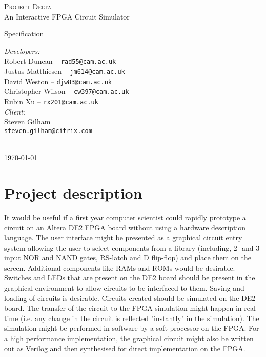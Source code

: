 \documentclass[12pt, a4paper, oneside,titlepage]{article}
\begin{document}
 \begin{titlepage}
 \begin{center}
 \textsc{\huge{Project Delta}} \\
 {\Large{An Interactive FPGA Circuit Simulator}}
\end{center}
\vspace{10em}
 \begin{center}
{\huge{Specification}}
\end{center}
\vfill
\setlength{\columnsep}{10em}
\begin{multicols}{2}{
\emph{Developers:}\\
Robert Duncan -- \texttt{rad55@cam.ac.uk} \\
Justus Matthiesen -- \texttt{jm614@cam.ac.uk}\\
David Weston -- \texttt{djw83@cam.ac.uk}\\
Christopher Wilson -- \texttt{cw397@cam.ac.uk}\\
Rubin Xu -- \texttt{rx201@cam.ac.uk}\\
\emph{Client:}\\
Steven Gilham\\
\texttt{steven.gilham@citrix.com}
\\
\\
}
\end{multicols}
\begin{center}
\today
\end{center}
 \end{titlepage}
\tableofcontents
\pagebreak
\section{Project description}
It would be useful if a first year computer scientist could rapidly prototype a circuit on an Altera DE2 FPGA board without using a hardware description language. The user interface might be presented as a graphical circuit entry system allowing the user to select components from a library (including, 2- and 3-input NOR and NAND gates, RS-latch and D flip-flop) and place them on the screen. Additional components like RAMs and ROMs would be desirable. Switches and LEDs that are present on the DE2 board should be present in the graphical environment to allow circuits to be interfaced to them. Saving and loading of circuits is desirable. Circuits created should be simulated on the DE2 board. The transfer of the circuit to the FPGA simulation might happen in real-time (i.e. any change in the circuit is reflected "instantly" in the simulation). The simulation might be performed in software by a soft processor on the FPGA. For a high performance implementation, the graphical circuit might also be written out as Verilog and then synthesised for direct implementation on the FPGA.
\end{document}
